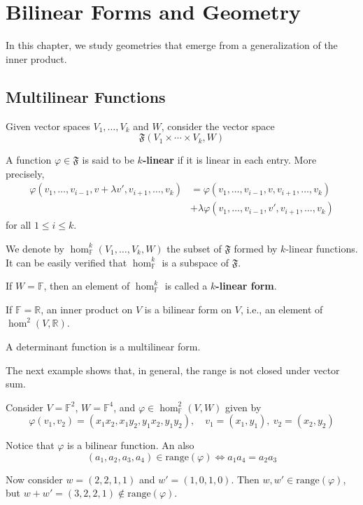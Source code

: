 \chapter{Bilinear Forms and Geometry}

In this chapter, we study geometries that emerge from a generalization of the inner product. 

\section{Multilinear Functions}

\begin{definition}
Given vector spaces $V_1, \ldots, V_k$ and $W$, consider the vector space 
\[
  \mathfrak{F}(V_1 \times \cdots \times V_k, W)
\]

A function $\varphi \in \mathfrak{F}$ is said to be \textbf{$k$-linear} if it is linear in each entry. More precisely,
\begin{equation*}
  \begin{aligned}
    \varphi(v_1, \ldots, v_{i-1}, v + \lambda v', v_{i+1}, \ldots, v_k) &= \varphi(v_1, \ldots, v_{i-1}, v, v_{i+1}, \ldots, v_k) \\
    &+ \lambda \varphi(v_1, \ldots, v_{i-1}, v', v_{i+1}, \ldots, v_k)
  \end{aligned}
\end{equation*}
for all $1 \leq i \leq k$.

We denote by $\hom_{\mathbb{F}}^k (V_1, \ldots, V_k, W)$ the subset of $\mathfrak{F}$ formed by $k$-linear functions. It can be easily verified that $\hom_{\mathbb{F}}^k$ is a subspace of $\mathfrak{F}$.

If $W = \mathbb{F}$, then an element of $\hom_{\mathbb{F}}^k$ is called a \textbf{$k$-linear form}. 
\end{definition}

\begin{example}
If $\mathbb{F} = \mathbb{R}$, an inner product on $V$ is a bilinear form on $V$, i.e., an element of $\hom^2(V, \mathbb{R})$. 
\end{example}

\begin{example}[Determinant]
  A determinant function is a multilinear form.
\end{example}

The next example shows that, in general, the range is not closed under vector sum. 

\begin{example}
  Consider $V = \mathbb{F}^2$, $W = \mathbb{F}^4$, and $\varphi \in \hom_{\mathbb{F}}^2(V,W)$ given by
  \[
    \varphi(v_1, v_2) = (x_1 x_2, x_1 y_2, y_1 x_2, y_1 y_2), \quad v_1 = (x_1, y_1), ~v_2 = (x_2, y_2)
  \]

  Notice that $\varphi$ is a bilinear function. An also
  \[
    (a_1, a_2, a_3, a_4) \in \text{range}(\varphi) \iff a_1 a_4 = a_2 a_3
  \]

  Now consider $w = (2,2,1,1)$ and $w' = (1,0,1,0)$. Then $w, w' \in \text{range}(\varphi)$, but $w + w' = (3,2,2,1) \notin \text{range}(\varphi)$.
\end{example}

